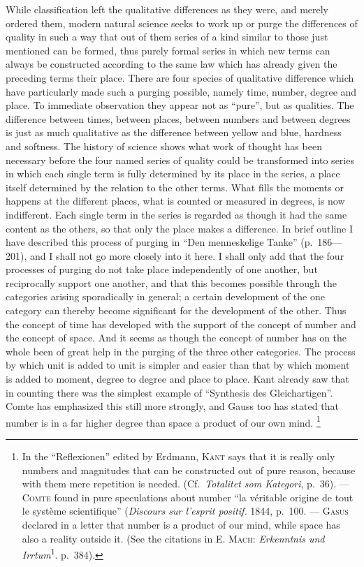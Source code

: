 \documentclass[12pt]{article}
\newcommand{\opage}[1]{\marginnote{\footnotesize\textit{[#1]}}}
\begin{document}
While classification left the qualitative differences as they were, and
merely ordered them, modern natural science seeks to work up or purge the
differences of quality in such a way that out of them series of a kind
similar to those just mentioned can be formed, thus purely formal series in
which new terms can always be constructed according to the same law which
has already given the preceding terms their place. There are four species of
qualitative difference which have particularly made such a purging possible,
namely time, number, degree and place. To immediate observation they appear
not as ``pure'', but as qualities. The difference between times, between
places, between numbers and between degrees is just as much qualitative as
the difference between yellow and blue, hardness and softness. The history
of science shows what work of thought has been necessary before the four
named series of quality could be transformed into series in which each
single term is fully determined by its place in the series, a place itself
determined by the relation to the other terms. What fills the moments or
happens at the different places, what is counted or measured in degrees, is
now indifferent. Each single \opage{39}term in the series is regarded as though it had
the same content as the others, so that only the place makes a difference.
In brief outline I have described this process of purging in ``Den
menneskelige Tanke'' (p.~186---201), and I shall not go more closely into it
here. I shall only add that the four processes of purging do not take place
independently of one another, but reciprocally support one another, and that
this becomes possible through the categories arising sporadically in
general; a certain development of the one category can thereby become
significant for the development of the other. Thus the concept of time has
developed with the support of the concept of number and the concept of
space. And it seems as though the concept of number has on the whole been of
great help in the purging of the three other categories. The process by
which unit is added to unit is simpler and easier than that by which moment
is added to moment, degree to degree and place to place. Kant already saw
that in counting there was the simplest example of ``Synthesis des
Gleichartigen''. Comte has emphasized this still more strongly, and Gauss
too has stated that number is in a far higher degree than space a product of
our own mind.%
\footnote{In the ``Reflexionen'' edited by Erdmann, \textsc{Kant} says that
it is really only numbers and magnitudes that can be constructed out of pure
reason, because with them mere repetition is needed. (Cf.\ \textit{Totalitet
som Kategori}, p.~36). --- \textsc{Comte} found in pure speculations about
number ``la véritable origine de tout le système scientifique''
(\textit{Discours sur l'esprit positif.} 1844, p.~100. --- \textsc{Gasus}
declared in a letter that number is a product of our mind, while space has
also a reality outside it. (See the citations in E. \textsc{Mach}:
\textit{Erkenntnis und Irrtum}\textsuperscript{1}. p.~384).}
\end{document}

